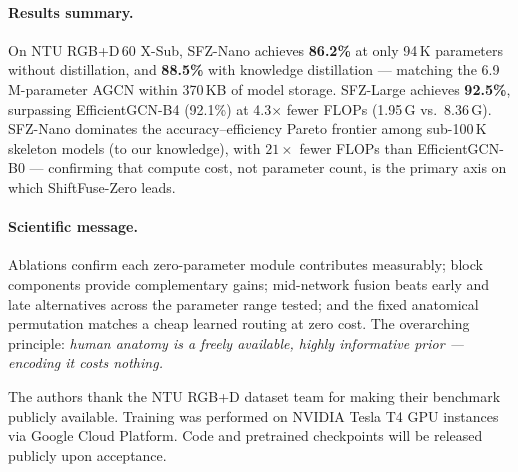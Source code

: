 \documentclass[sigconf,screen,review,anonymous]{acmart}
\begin{document}
\paragraph*{Results summary.}
On NTU RGB+D\,60 X-Sub, SFZ-Nano achieves \textbf{86.2\%} at only
94\,K parameters without distillation, and \textbf{88.5\%} with
knowledge distillation --- matching the 6.9\,M-parameter AGCN within
370\,KB of model storage.
SFZ-Large achieves \textbf{92.5\%}, surpassing Ef\-ficientGCN-B4 (92.1\%)
at 4.3${\times}$ fewer FLOPs (1.95\,G vs.\ 8.36\,G).
SFZ-Nano dominates the accuracy--efficiency Pareto frontier among
sub-100\,K skeleton models (to our knowledge), with $21{\times}$ fewer FLOPs than
Ef\-ficientGCN-B0 --- confirming that compute cost, not parameter count,
is the primary axis on which ShiftFuse-Zero leads.

\paragraph*{Scientific message.}
Ablations confirm each zero-parameter module contributes measurably;
block components provide complementary gains; mid-network fusion beats
early and late alternatives across the parameter range tested; and the fixed anatomical
permutation matches a cheap learned routing at zero cost.
The overarching principle: \emph{human anatomy is a freely available,
highly informative prior --- encoding it costs nothing.}

\begin{acks}
The authors thank the NTU RGB+D dataset team for making their
benchmark publicly available.
Training was performed on NVIDIA Tesla T4 GPU instances via Google Cloud Platform.
Code and pretrained checkpoints will be released publicly upon acceptance.
\end{acks}



\end{document}
